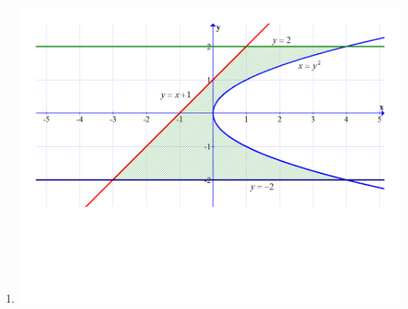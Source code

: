 \documentclass[12pt]{article}
\newif\ifans
\begin{document}
\begin{enumerate}
\begin{center}
\ifans{\fbox{$A=4\sqrt{2}$}} \fi

\end{center}

\item \text{ }

\begin{center}

\includegraphics[scale=0.3]{graph4.pdf}

\ifans{\fbox{$A=\frac{28}{3}$; Detailed Solution: \textcolor{blue}{\href{http://www.math.drexel.edu/classes/Calculus/resources/Math122HW/Solutions/122_07_Area_Between_Curves_04.pdf}{Here}}}} \fi

\end{center}

\end{enumerate}

\end{document}
